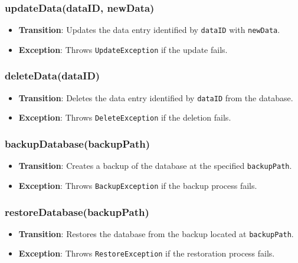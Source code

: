 \documentclass[12pt, titlepage]{article}
\begin{document}
\subsubsection{updateData(dataID, newData)}
\begin{itemize}
    \item \textbf{Transition}: Updates the data entry identified by \texttt{dataID} with \texttt{newData}.
    \item \textbf{Exception}: Throws \texttt{UpdateException} if the update fails.
\end{itemize}

\subsubsection{deleteData(dataID)}
\begin{itemize}
    \item \textbf{Transition}: Deletes the data entry identified by \texttt{dataID} from the database.
    \item \textbf{Exception}: Throws \texttt{DeleteException} if the deletion fails.
\end{itemize}

\subsubsection{backupDatabase(backupPath)}
\begin{itemize}
    \item \textbf{Transition}: Creates a backup of the database at the specified \texttt{backupPath}.
    \item \textbf{Exception}: Throws \texttt{BackupException} if the backup process fails.
\end{itemize}

\subsubsection{restoreDatabase(backupPath)}
\begin{itemize}
    \item \textbf{Transition}: Restores the database from the backup located at \texttt{backupPath}.
    \item \textbf{Exception}: Throws \texttt{RestoreException} if the restoration process fails.
\end{itemize}
\end{document}
